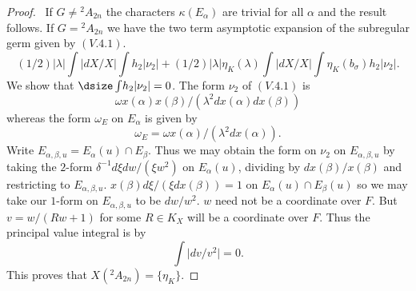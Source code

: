 \documentclass{memo-l}
\theoremstyle{definition}
\theoremstyle{remark}
\numberwithin{section}{chapter}
\numberwithin{equation}{chapter}
\begin{document}
\begin{proof} \ If $G \ne {{}^{2}A_{2n}}$ the characters
${\kappa}(E_{{\alpha}})$ are trivial for all ${\alpha}$ and the result
follows.  If $G  =  {}^{2}A_{2n}$ we have the two term asymptotic expansion of
the subregular germ given by $(V.4.1)$.
$$
(1/2)\vert {\lambda}\vert \int\vert dX/X\vert \int h_{2}\vert
{\nu}_{2}\vert + (1/2)\vert {\lambda}\vert {\eta}_{K}({\lambda}) \int
\vert dX/X\vert \int {\eta}_{K}(b_{{\sigma}})h_{2}\vert {\nu}_{2}\vert.
$$
We show that ${\dsize\int} h_{2}\vert {\nu}_{2}\vert  =  0$.  The form ${\nu}_{2}$ of
$(V.4.1)$ is
$$
{\omega}x({\alpha})x({\beta})/({\lambda}^{2}dx({\alpha})dx({\beta}))
$$
whereas the form ${\omega}_{E}$ on $E_{{\alpha}}$ is given by
$$
{\omega}_{E}  =  {\omega}x({\alpha})/({\lambda}^{2}dx({\alpha})).
$$
Write $E_{\alpha,\beta,u} = E_\alpha(u)\cap E_\beta$.  Thus we may obtain the form on ${\nu}_{2}$ on $E_{\alpha,\beta,u}$ by taking the $2$-form ${\delta}^{-1}d{\xi}dw/({\xi}w^{2})$ on
$E_{{\alpha}}(u)$, dividing by $dx({\beta})/x({\beta})$ and restricting to
$E_{\alpha,\beta,u}$.  $x({\beta})d{\xi}/({\xi}dx({\beta}))
 =  1$ on $E_{{\alpha}}(u) {\cap} E_{{\beta}}(u)$ so we may take our $1$-form
on $E_{\alpha,\beta,u}$ to be $dw/w^{2}$.  $w$ need not be
a coordinate over $F$.  But $v  =  w/(Rw+1)$ for some $R  \in  K_X$ will be a
coordinate over $F$.  Thus the principal value integral is by \cite{MR748510}
$$
\int\vert dv/v^{2}\vert  =  0.
$$
This proves that $X(^{2}A_{2n})  =  \{{\eta}_{K}\}$.
\end{proof}

{\medskip}
\end{document}
